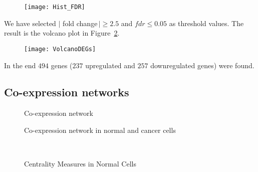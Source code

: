 \documentclass[
10pt, %
a4paper, %
oneside, %
headinclude,footinclude, %
BCOR5mm, %
]{scrartcl}
\begin{document}
\begin{figure}[H]
\centering 
\texttt{[image: Hist\_FDR]} 
\caption[]{} %
\label{fig:2} 
\end{figure}

We have selected  $|$ fold change$\, | \ge 2.5$ and $fdr \le 0.05$ as threshold values. The result is the volcano plot in Figure~\ref{fig:3}.

\begin{figure}[H]
\centering 
\texttt{[image: VolcanoDEGs]} 
\caption[Volcano Plot]{} %
\label{fig:3} 
\end{figure}

In the end $494$ genes ($237$ upregulated and $257$ downregulated genes) were found.


\subsection{Co-expression networks}


\begin{figure}[H]
\centering
{} \quad
{} 
\caption[Co-expression network]{Co-expression network} %
\label{fig:4}
\end{figure}


\begin{figure}[H]
\centering
{} \quad
{} 
\caption[Co-expression network Degree Distribution]{Co-expression network in normal and cancer cells} %
\label{fig:5}
\end{figure}

\begin{figure}[H]
\centering
{} \quad
{} \\
 \quad
{}
\caption[Centrality Measures Co-Net in normal cells]{Centrality Measures in Normal Cells} %
\label{fig:6}
\end{figure}
\end{document}
